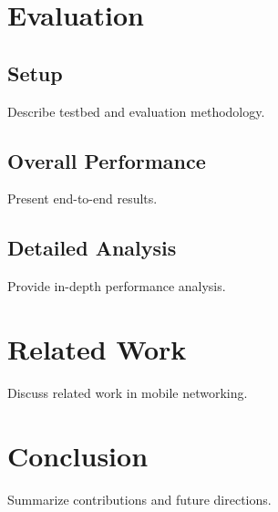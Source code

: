 \documentclass[sigconf,review]{acmart}
\begin{document}
\section{Evaluation}
\subsection{Setup}
Describe testbed and evaluation methodology.

\subsection{Overall Performance}
Present end-to-end results.

\subsection{Detailed Analysis}
Provide in-depth performance analysis.

\section{Related Work}
Discuss related work in mobile networking.

\section{Conclusion}
Summarize contributions and future directions.



\end{document}
